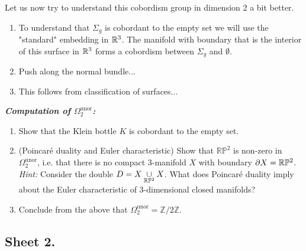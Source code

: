 \noindent Let us now try to understand this cobordism group in dimension 2 a bit better.

	\begin{enumerate}[label=(\alph*)]
		\item To understand that $\Sigma_g$ is cobordant to the empty set we will use the "standard" embedding in $\mathbb{R}^3$. The manifold with boundary that is the interior of this surface in $\mathbb{R}^3$ forms a cobordism between $\Sigma_g$ and $\emptyset$.
		\item Push along the normal bundle...
		\item This follows from classification of surfaces...
	\end{enumerate}

\newpage

\begin{exercise} \textbf{\textit{Computation of \(\Omega_2^{\textrm{unor}}\):}}
	\begin{enumerate}[label=(\alph*)]
		\item Show that the Klein bottle \(K\) is cobordant to the empty set. %
		\item (Poincaré duality and Euler characteristic) Show that \(\mathbb{R}\mathbb{P}^2\) is non-zero in \(\Omega_2^{\textrm{unor}}\), i.e. that there is no compact 3-manifold $X$ with boundary $\partial X = \mathbb{R} \mathbb{P}^2$. \\
        \textit{Hint:} Consider the double $D= X \underset{\mathbb{R} \mathbb{P}^2}{\cup} X$. What does Poincaré duality imply
        about the Euler characteristic of 3-dimensional closed manifolds?
		\item Conclude from the above that \(\Omega_2^{\textrm{unor}} = \mathbb{Z}/{2\mathbb{Z}}\).
	\end{enumerate}
\end{exercise}




\subsection*{Sheet 2.}

